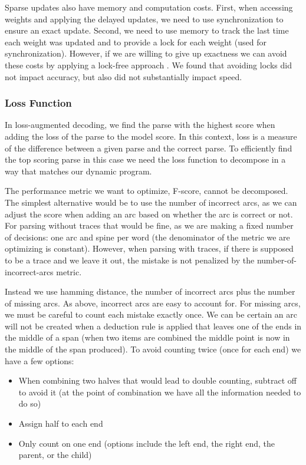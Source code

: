 Sparse updates also have memory and computation costs.
First, when accessing weights and applying the delayed updates, we need to use synchronization to ensure an exact update.
Second, we need to use memory to track the last time each weight was updated and to provide a lock for each weight (used for synchronization).
However, if we are willing to give up exactness we can avoid these costs by applying a lock-free approach \parencite{hogwild}.
We found that avoiding locks did not impact accuracy, but also did not substantially impact speed.


\subsubsection{Loss Function}

In loss-augmented decoding, we find the parse with the highest score when adding the loss of the parse to the model score.
In this context, loss is a measure of the difference between a given parse and the correct parse.
To efficiently find the top scoring parse in this case we need the loss function to decompose in a way that matches our dynamic program.

The performance metric we want to optimize, F-score, cannot be decomposed.
The simplest alternative would be to use the number of incorrect arcs, as we can adjust the score when adding an arc based on whether the arc is correct or not.
For parsing without traces that would be fine, as we are making a fixed number of decisions: one arc and spine per word (\myie the denominator of the metric we are optimizing is constant).
However, when parsing with traces, if there is supposed to be a trace and we leave it out, the mistake is not penalized by the number-of-incorrect-arcs metric.

Instead we use hamming distance, the number of incorrect arcs plus the number of missing arcs.
As above, incorrect arcs are easy to account for.
For missing arcs, we must be careful to count each mistake exactly once.
We can be certain an arc will not be created when a deduction rule is applied that leaves one of the ends in the middle of a span (\myeg when two items are combined the middle point is now in the middle of the span produced).
To avoid counting twice (once for each end) we have a few options:

\begin{itemize}
  \item When combining two halves that would lead to double counting, subtract off to avoid it (at the point of combination we have all the information needed to do so)
  \item Assign half to each end
  \item Only count on one end (options include the left end, the right end, the parent, or the child)
\end{itemize}

